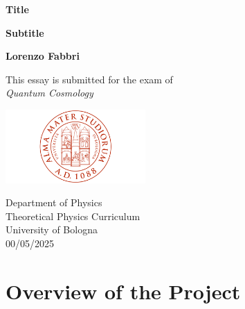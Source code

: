 \documentclass[a4paper,12pt,oneside,customfont,custombib,PageStyleI]{Settings/PhDThesisPSnPDF}
\begin{document}
\begin{titlepage}
    \begin{center}
        \vspace*{1cm}
            
        \Huge
        \textbf{Title}
            
        \vspace{0.5cm}
        \large
        \textbf{Subtitle}
            
        \vspace{1.5cm}
        \Large    
        \textbf{Lorenzo Fabbri}
            
        \vfill
        \large   
        This essay is submitted for the exam of\\
        \textit{Quantum Cosmology}
            
        \vspace{0.8cm}
            
        \includegraphics[width=0.4\textwidth]{Graphics/UniversityCrest.png}
            
        \large
        Department of Physics\\
        Theoretical Physics Curriculum\\
        University of Bologna\\
        00/05/2025
            
    \end{center}
\end{titlepage}

\frontmatter


\begin{spacing}{1.3}
    \tableofcontents
\end{spacing}

\mainmatter
\chapter{Overview of the Project}\label{chap:chapter1}
%
\end{document}
